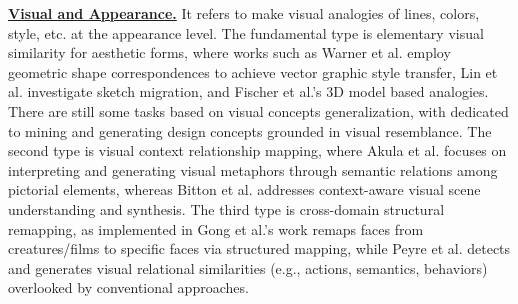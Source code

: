 \textbf{\underline{Visual and Appearance.}} It refers to make visual analogies of lines, colors, style, etc. at the appearance level. 
The fundamental type is elementary visual similarity for aesthetic forms, where works such as Warner et al. employ geometric shape correspondences to achieve vector graphic style transfer\cite{warner2023interactive}, Lin et al. investigate sketch migration\cite{lin2025inkspire}, and Fischer et al.'s 3D model based analogies\cite{fischer2024nerf}. There are still some tasks based on visual concepts generalization, with \cite{yu2016distributed, edwards2024advise} dedicated to mining and generating design concepts grounded in visual resemblance. The second type is visual context relationship mapping, where Akula et al. focuses on interpreting and generating visual metaphors through semantic relations among pictorial elements\cite{akula2023metaclue}, whereas Bitton et al. addresses context-aware visual scene understanding and synthesis\cite{bitton2023vasr}. The third type is cross-domain structural remapping, as implemented in Gong et al.'s work remaps faces from creatures/films to specific faces via structured mapping\cite{gong2023toontalker}, while Peyre et al. detects and generates visual relational similarities (e.g., actions, semantics, behaviors) overlooked by conventional approaches\cite{peyre2019detecting}.




